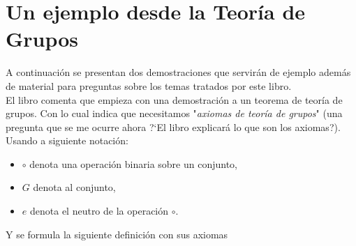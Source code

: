 \section*{Un ejemplo desde la Teor\'ia de Grupos}
A continuaci\'on se presentan dos demostraciones que servir\'an de ejemplo adem\'as de material para preguntas sobre los temas tratados por este libro.\\
El libro comenta que empieza con una demostraci\'on a un teorema de teor\'ia de grupos. Con lo cual indica que necesitamos "\emph{axiomas de teor\'ia de grupos}" (una pregunta que se me ocurre ahora ?`El libro explicar\'a lo que son los axiomas?).\\
Usando a siguiente notaci\'on:
\begin{itemize}
	\item $\circ$ denota una operaci\'on binaria sobre un conjunto,
	\item $G$ denota al conjunto,
	\item $e$ denota el neutro de la operaci\'on $\circ$.
\end{itemize}
Y se formula la siguiente definici\'on con sus axiomas
